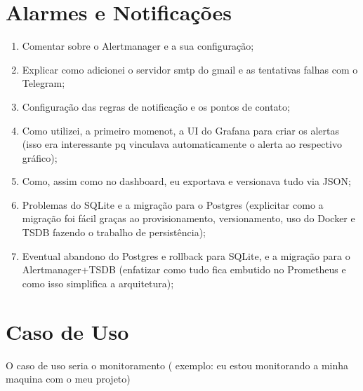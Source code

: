 {\section{Alarmes e Notificações}
\label{section:AlarmesNotificacoes
}
\begin{enumerate}
  \item Comentar sobre o Alertmanager e a sua configuração;
  \item Explicar como adicionei o servidor smtp do gmail e as tentativas falhas com o Telegram;
  \item Configuração das regras de notificação e os pontos de contato;
  \item Como utilizei, a primeiro momenot, a UI do Grafana para criar os alertas (isso era interessante pq vinculava automaticamente o alerta ao respectivo gráfico);
  \item Como, assim como no dashboard, eu exportava e versionava tudo via JSON;
  \item Problemas do SQLite e a migração para o Postgres (explicitar como a migração foi fácil graças ao provisionamento, versionamento, uso do Docker e TSDB fazendo o trabalho de persistência);
  \item Eventual abandono do Postgres e rollback para SQLite, e a migração para o Alertmanager+TSDB (enfatizar como tudo fica embutido no Prometheus e como isso simplifica a arquitetura);
\end{enumerate}


}


\section{Caso de Uso}
\label{section:CasosDeUso}

O caso de uso seria o monitoramento ( exemplo: eu estou monitorando a minha maquina com o meu projeto)



